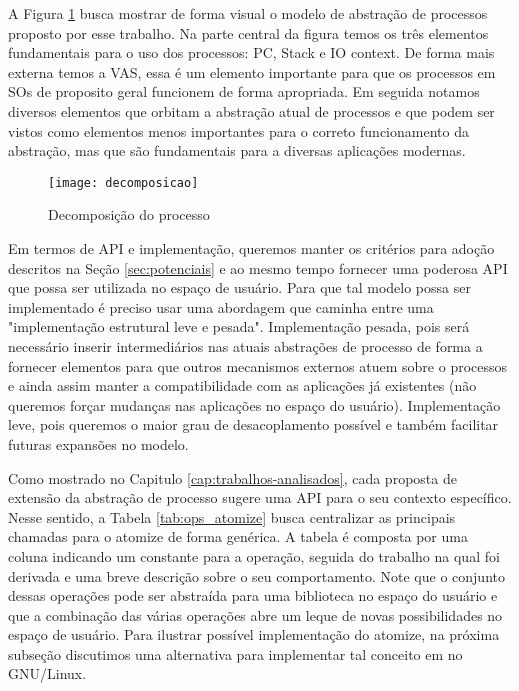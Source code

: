 

A Figura \ref{fig:decomposicao_proc} busca mostrar de forma visual o modelo de
abstração de processos proposto por esse trabalho. Na parte central da figura
temos os três elementos fundamentais para o uso dos processos: PC, Stack e IO
context. De forma mais externa temos a VAS, essa é um elemento importante para
que os processos em SOs de proposito geral funcionem de forma apropriada. Em
seguida notamos diversos elementos que orbitam a abstração atual de processos e
que podem ser vistos como elementos menos importantes para o correto
funcionamento da abstração, mas que são fundamentais para a diversas aplicações
modernas.

\begin{figure}[!h]
  \centering
  \texttt{[image: decomposicao]}
  \caption{Decomposição do processo}
  \label{fig:decomposicao_proc}
\end{figure}

Em termos de API e implementação, queremos manter os critérios para adoção
descritos na Seção \ref{sec:potenciais} e ao mesmo tempo fornecer uma poderosa
API que possa ser utilizada no espaço de usuário. Para que tal modelo possa ser
implementado é preciso usar uma abordagem que caminha entre uma "implementação
estrutural leve e pesada". Implementação pesada, pois será necessário inserir
intermediários nas atuais abstrações de processo de forma a fornecer elementos
para que outros mecanismos externos atuem sobre o processos e ainda assim
manter a compatibilidade com as aplicações já existentes (não queremos forçar
mudanças nas aplicações no espaço do usuário). Implementação leve, pois
queremos o maior grau de desacoplamento possível e também facilitar futuras
expansões no modelo.

Como mostrado no Capitulo \ref{cap:trabalhos-analisados}, cada proposta de
extensão da abstração de processo sugere uma API para o seu contexto
específico. Nesse sentido, a Tabela \ref{tab:ops_atomize} busca centralizar as
principais chamadas para o atomize de forma genérica. A tabela é composta por
uma coluna indicando um constante para a operação, seguida do trabalho na qual
foi derivada e uma breve descrição sobre o seu comportamento. Note que o
conjunto dessas operações pode ser abstraída para uma biblioteca no espaço do
usuário e que a combinação das várias operações abre um leque de novas
possibilidades no espaço de usuário. Para ilustrar possível implementação do
atomize, na próxima subseção discutimos uma alternativa para implementar tal
conceito em no GNU/Linux.

